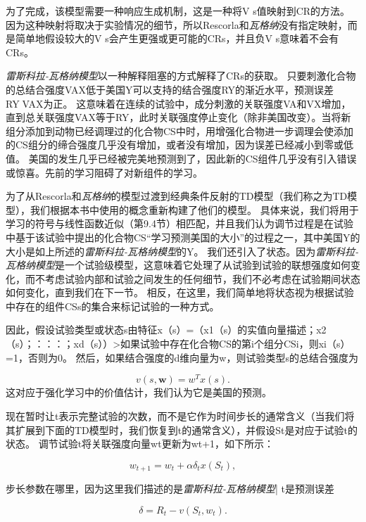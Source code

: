 {为了完成，该模型需要一种响应生成机制，这是一种将V s值映射到CR的方法。
因为这种映射将取决于实验情况的细节，所以Rescorla和\textit{瓦格纳}没有指定映射，而是简单地假设较大的V s会产生更强或更可能的CRs，并且负V s意味着不会有CRs。


\textit{雷斯科拉-瓦格纳模型}以一种解释阻塞的方式解释了CRs的获取。
只要刺激化合物的总结合强度VAX低于美国Y可以支持的结合强度RY的渐近水平，预测误差RY􀀀VAX为正。
这意味着在连续的试验中，成分刺激的关联强度VA和VX增加，直到总关联强度VAX等于RY，此时关联强度停止变化（除非美国改变）。当将新组分添加到动物已经调理过的化合物CS中时，用增强化合物进一步调理会使添加的CS组分的缔合强度几乎没有增加，或者没有增加，因为误差已经减小到零或低值。
美国的发生几乎已经被完美地预测到了，因此新的CS组件几乎没有引入错误或惊喜。先前的学习阻碍了对新组件的学习。


为了从Rescorla和\textit{瓦格纳}的模型过渡到经典条件反射的TD模型（我们称之为TD模型），我们根据本书中使用的概念重新构建了他们的模型。
具体来说，我们将用于学习的符号与线性函数近似（第9.4节）相匹配，并且我们认为调节过程是在试验中基于该试验中提出的化合物CS“学习预测美国的大小”的过程之一，其中美国Y的大小是如上所述的\textit{雷斯科拉-瓦格纳模型}的Y。
我们还引入了状态。因为\textit{雷斯科拉-瓦格纳模型}是一个试验级模型，这意味着它处理了从试验到试验的联想强度如何变化，而不考虑试验内部和试验之间发生的任何细节，我们不必考虑在试验期间状态如何变化，直到我们在下一节。
相反，在这里，我们简单地将状态视为根据试验中存在的组件CSs的集合来标记试验的一种方式。


因此，假设试验类型或状态s由特征x（s）=（x1（s）的实值向量描述；x2（s）；：：：；xd（s））>如果试验中存在化合物CS的第i个组分CSi，则xi（s）=1，否则为0。
然后，如果结合强度的d维向量为w，则试验类型s的总结合强度为

\begin{equation}\label{key}
	v(s, \textbf{w}) = 
		w^T x(s).
\end{equation}
这对应于强化学习中的价值估计，我们认为它是美国的预测。

现在暂时让t表示完整试验的次数，而不是它作为时间步长的通常含义（当我们将其扩展到下面的TD模型时，我们恢复到t的通常含义），并假设St是对应于试验t的状态。
调节试验t将关联强度向量wt更新为wt+1，如下所示：

\begin{equation}\label{key}
	w_{t+1} = w_t + \alpha \delta_t x(S_t),
\end{equation}

步长参数在哪里，因为这里我们描述的是\textit{雷斯科拉-瓦格纳模型}| t是预测误差
	
\begin{equation}\label{key}
	\delta = R_t - v (S_t, w_t).
\end{equation}


}
